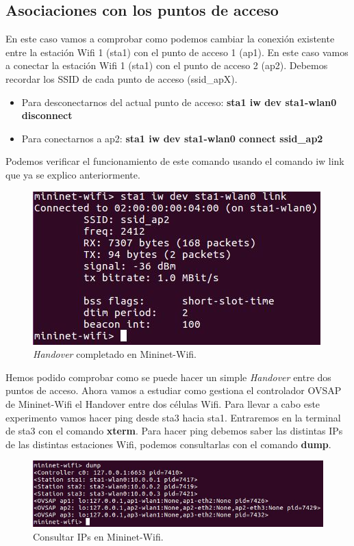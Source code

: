 \subsection{Asociaciones con los puntos de acceso}
En este caso vamos a comprobar como podemos cambiar la conexión existente entre la estación Wifi 1 (sta1) con el punto de acceso 1 (ap1). En este caso vamos a conectar la estación Wifi 1 (sta1) con el punto de acceso 2 (ap2). Debemos recordar los SSID de cada punto de acceso (ssid\_apX).\newline
\newline
\begin{center}
\begin{itemize}
    \item  Para desconectarnos del actual punto de acceso:  \textbf{sta1 iw dev sta1-wlan0 disconnect}
    \item Para conectarnos a ap2: \textbf{sta1 iw dev sta1-wlan0 connect ssid\_ap2}
\end{itemize}
\end{center}
Podemos verificar el funcionamiento de este comando usando el comando iw link que ya se explico anteriormente.
\begin{figure}[!htb]
  \centering
    \includegraphics[width=0.5\linewidth]{./img/test/12.JPG}
    \caption{\textit{Handover} completado en Mininet-Wifi.}
  \label{fig:yo}
\end{figure}
Hemos podido comprobar como se puede hacer un simple \textit{Handover} entre dos puntos de acceso.
\newpage
Ahora vamos a estudiar como gestiona el controlador OVSAP de Mininet-Wifi el Handover entre dos células Wifi. Para llevar a cabo este experimento vamos hacer ping desde sta3 hacia sta1. Entraremos en la terminal de sta3 con el comando \textbf{xterm}. Para hacer ping debemos saber las distintas IPs de las distintas estaciones Wifi, podemos consultarlas con el comando \textbf{dump}.
\begin{figure}[!htb]
  \centering
    \includegraphics[width=\linewidth]{./img/test/13.JPG}
    \caption{Consultar IPs en Mininet-Wifi.}
  \label{fig:yo}
\end{figure}
